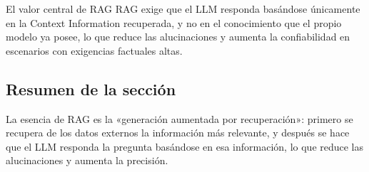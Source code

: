 \begin{knowledgebox}{El valor central de RAG}
RAG exige que el LLM responda basándose únicamente en la Context Information recuperada, y no en el conocimiento que el propio modelo ya posee, lo que reduce las alucinaciones y aumenta la confiabilidad en escenarios con exigencias factuales altas.
\end{knowledgebox}

\subsection{Resumen de la sección}

La esencia de RAG es la «generación aumentada por recuperación»: primero se recupera de los datos externos la información más relevante, y después se hace que el LLM responda la pregunta basándose en esa información, lo que reduce las alucinaciones y aumenta la precisión.

